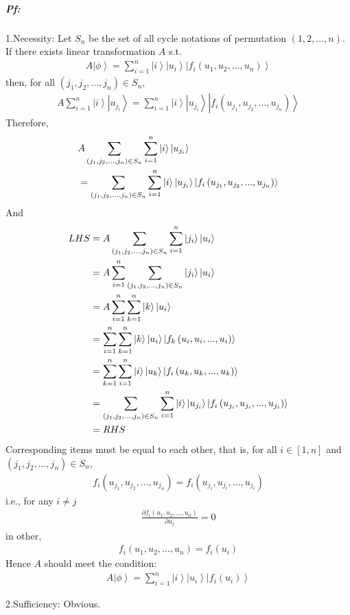 \documentclass[%
 reprint,
 amsmath,amssymb,
pra,
]{revtex4-1}
\begin{document}
\subparagraph{Pf:} 1.Necessity: Let $S_n$ be the set of all cycle notations of permutation $\left(1, 2, ..., n\right)$. If there exists linear transformation $A$ s.t. 
\begin{align*}
	A\left|\phi\right\rangle = \sum_{i=1}^n \left|i\right\rangle\left|u_i\right\rangle\left|f_{i}\left(u_1, u_2, ..., u_n\right)\right\rangle
\end{align*}
then, for all $\left(j_1, j_2, ..., j_n\right)\in S_n$, 
\begin{align*}
	A\sum_{i=1}^n \left|i\right\rangle\left|u_{j_i}\right\rangle = \sum_{i=1}^n \left|i\right\rangle\left|u_{j_i}\right\rangle\left|f_{i}\left(u_{j_1}, u_{j_2}, ..., u_{j_n}\right)\right\rangle
\end{align*}
Therefore,  
\begin{align*}
	&A\sum_{\left(j_1, j_2, ..., j_n\right)\in S_n}\sum_{i=1}^n \left|i\right\rangle\left|u_{j_i}\right\rangle \notag\\
	&=\sum_{\left(j_1, j_2, ..., j_n\right)\in S_n}\sum_{i=1}^n\left|i\right\rangle\left|u_{j_i}\right\rangle\left|f_{i}\left(u_{j_1}, u_{j_2}, ..., u_{j_n}\right)\right\rangle
\end{align*}
And
\begin{align*}
	LHS &= A\sum_{\left(j_1, j_2, ..., j_n\right)\in S_n}\sum_{i=1}^n \left|j_i\right\rangle\left|u_i\right\rangle\notag\\
	&= A\sum_{i=1}^n\sum_{\left(j_1, j_2, ..., j_n\right)\in S_n}\left|j_i\right\rangle\left|u_i\right\rangle\notag\\
	&= A\sum_{i=1}^n\sum_{k=1}^n\left|k\right\rangle\left|u_i\right\rangle \notag\\
	&= \sum_{i=1}^n\sum_{k=1}^n\left|k\right\rangle\left|u_i\right\rangle\left|f_{k}\left(u_i, u_i, ..., u_i\right)\right\rangle\notag\\
	&= \sum_{k=1}^n\sum_{i=1}^n\left|i\right\rangle\left|u_k\right\rangle\left|f_{i}\left(u_k, u_k, ..., u_k\right)\right\rangle\notag \\
	&= \sum_{\left(j_1, j_2, ..., j_n\right)\in S_n}\sum_{i=1}^n\left|i\right\rangle\left|u_{j_i}\right\rangle\left|f_{i}\left(u_{j_i}, u_{j_i}, ..., u_{j_i}\right)\right\rangle\notag\\
	&= RHS
\end{align*}
Corresponding items must be equal to each other, that is, for all $i \in \left[1, n\right]$ and $\left(j_1, j_2, ..., j_n\right)\in S_n$, 
\begin{align*}
	f_{i}\left(u_{j_1}, u_{j_2}, ..., u_{j_n}\right) = f_{i}\left(u_{j_i}, u_{j_i}, ..., u_{j_i}\right)
\end{align*}
i.e., for any $i\neq j$
\begin{align*}
	\frac{\partial f_i\left(u_1, u_2, ..., u_n\right)}{\partial u_j} = 0
\end{align*}
in other, 
\begin{align*}
	f_i\left(u_1, u_2, ...,u_n\right) = f_i\left(u_i\right)
\end{align*}
Hence $A$ should meet the condition: 
\begin{align*}
	A\left|\phi\right\rangle = \sum_{i=1}^n \left|i\right\rangle\left|u_i\right\rangle\left|f_{i}\left(u_i\right)\right\rangle
\end{align*}

2.Sufficiency: Obvious.


\end{document}
